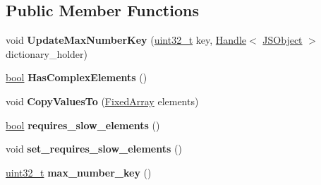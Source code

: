 \subsection*{Public Member Functions}
\begin{DoxyCompactItemize}
\item 
\mbox{\label{classv8_1_1internal_1_1NumberDictionary_abde4cee3bff2efdde628049c119a0dbd}} 
void {\bfseries Update\+Max\+Number\+Key} (\mbox{\hyperlink{classuint32__t}{uint32\+\_\+t}} key, \mbox{\hyperlink{classv8_1_1internal_1_1Handle}{Handle}}$<$ \mbox{\hyperlink{classv8_1_1internal_1_1JSObject}{J\+S\+Object}} $>$ dictionary\+\_\+holder)
\item 
\mbox{\label{classv8_1_1internal_1_1NumberDictionary_a03659cd5903eb4ab8dcec8b1527d217e}} 
\mbox{\hyperlink{classbool}{bool}} {\bfseries Has\+Complex\+Elements} ()
\item 
\mbox{\label{classv8_1_1internal_1_1NumberDictionary_afcb12af18f387dd1a3c9cc76a7594f41}} 
void {\bfseries Copy\+Values\+To} (\mbox{\hyperlink{classv8_1_1internal_1_1FixedArray}{Fixed\+Array}} elements)
\item 
\mbox{\label{classv8_1_1internal_1_1NumberDictionary_a08c2a217eebd6eae7e8c2c9fd4c97c7d}} 
\mbox{\hyperlink{classbool}{bool}} {\bfseries requires\+\_\+slow\+\_\+elements} ()
\item 
\mbox{\label{classv8_1_1internal_1_1NumberDictionary_ad1315df24c0681f60b1248fe63d56294}} 
void {\bfseries set\+\_\+requires\+\_\+slow\+\_\+elements} ()
\item 
\mbox{\label{classv8_1_1internal_1_1NumberDictionary_a186ec2de6842125d7d7926b68d51d081}} 
\mbox{\hyperlink{classuint32__t}{uint32\+\_\+t}} {\bfseries max\+\_\+number\+\_\+key} ()
\end{DoxyCompactItemize}
